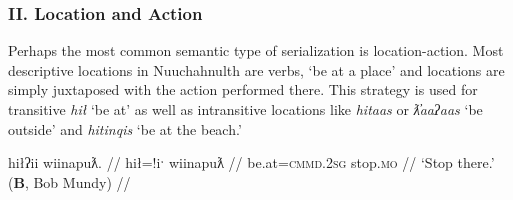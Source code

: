 \begin{comment}
Ordering preference. One of my speakers expressed a strong preference for the manner verb to precede the action. This mirrors how adverbs are used in Nuuchahnulth, which also tend to precede the verb. Other speakers I consulted with were comfortable with the verbs coming in either order.

\ex \label{ex:gohomedrive}
\begingl
\glpreamble ʔucičƛsiš šiiƛuk mituuni. //
\gla ʔu-ci-čiƛ=siˑš šiiƛuk mituuni  //
\glb \textsc{x}-go-\textsc{mo}=\textsc{strg.1sg} move.house-\textsc{dr} Victoria //
\glft `I moved to Victoria.' (\textbf{Q}, Sophie Billy) //
\endgl
\xe
FH
*waałšiʔaƛs ƛiiƛiiḥataḥ.
waałšiʔaƛs. ƛiiƛiiḥataḥʔaƛs.
\end{comment}

\vspace{10pt}

\subsubsection{II. Location and Action}

\vspace{10pt}

Perhaps the most common semantic type of serialization is location-action. Most descriptive locations in Nuuchahnulth are verbs, `be at a place' and locations are simply juxtaposed with the action performed there. This strategy is used for transitive \textit{hił} `be at' as well as intransitive locations like \textit{hitaas} or \textit{ƛ̓aaʔaas} `be outside' and \textit{hitinqis} `be at the beach.'

\ex \label{ex:stopthere}
\begingl
\glpreamble hiłʔii wiinapuƛ. //
\gla hił=!iˑ wiinapuƛ //
\glb be.at=\textsc{cmmd.2sg} stop.\textsc{mo} //
\glft `Stop there.' (\textbf{B}, Bob Mundy) //
\endgl
\xe

\begin{comment}
\ex \label{ex:workathome}
\begingl
\glpreamble hiłitin maḥt̓iiʔakqas mamuuk. //
\gla hił=(m)it=(m)in maḥt̓ii=ʔak=qaˑs mamuuk //
\glb be.at=\textsc{pst}=\textsc{strg.1pl} house=\textsc{poss}=\textsc{defn.1sg} work.\textsc{dr} //
\glft `We worked at my house.' (\textbf{N}, Fidelia Haiyupis) //
\endgl
\xe

\ex \label{ex:screamatbeach}
\begingl
\glpreamble n̓aʔiičiʔeƛ naʔuu łuucma ʕiikʕiika hitinqis. //
\gla n̓a-iˑčiƛ=!aƛ naʔuu łuucma ʕik-LR2L.a hitinqis //
\glb see-\textsc{in}=\textsc{now} be.with woman=\textsc{poss} scream-\textsc{rp} be.at.beach //
\glft `He heard a woman screaming on the beach.' (\textbf{C}, \textit{tupaat} Julia Lucas) //
\endgl
\xe
\end{comment}


